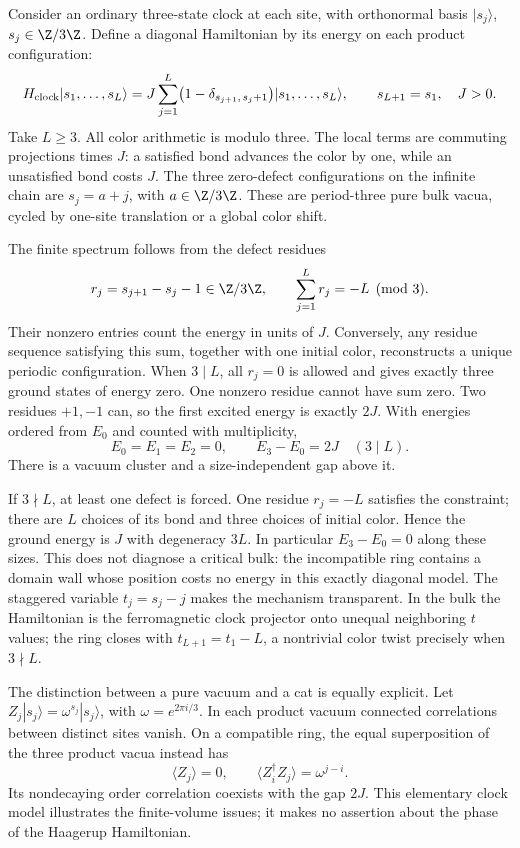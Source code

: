 \begin{example}
\label{ex:gapped-clock-frustration}
Consider an ordinary three-state clock at each site, with orthonormal
basis $|s_j\rangle$, $s_j\in\Z/3\Z$. Define a diagonal Hamiltonian
by its energy on each product configuration:
\[
 H_{\rm clock}|s_1,\ldots,s_L\rangle
 =J\sum_{j=1}^L\bigl(1-\delta_{s_{j+1},\,s_j+1}\bigr)
       |s_1,\ldots,s_L\rangle,
 \qquad s_{L+1}=s_1,\quad J>0.
\]
Take $L\ge3$. All color arithmetic is modulo three. The local
terms are commuting projections times $J$: a satisfied bond
advances the color by one, while an unsatisfied bond costs $J$.
The three zero-defect configurations on the infinite chain are
$s_j=a+j$, with $a\in\Z/3\Z$. These are period-three pure bulk
vacua, cycled by one-site translation or a global color shift.

The finite spectrum follows from the defect residues
\[
 r_j=s_{j+1}-s_j-1\in\Z/3\Z,
 \qquad \sum_{j=1}^L r_j=-L\pmod3.
\]
Their nonzero entries count the energy in units of $J$.
Conversely, any residue sequence satisfying this sum, together
with one initial color, reconstructs a unique periodic configuration.
When $3\mid L$, all $r_j=0$ is allowed and gives exactly three
ground states of energy zero. One nonzero residue cannot have
sum zero. Two residues $+1,-1$ can, so the first excited energy
is exactly $2J$. With energies ordered from $E_0$ and counted
with multiplicity,
\[
 E_0=E_1=E_2=0,\qquad E_3-E_0=2J
 \quad(3\mid L).
\]
There is a vacuum cluster and a size-independent gap above it.

If $3\nmid L$, at least one defect is forced. One residue
$r_j=-L$ satisfies the constraint; there are $L$ choices of
its bond and three choices of initial color. Hence the ground
energy is $J$ with degeneracy $3L$. In particular $E_3-E_0=0$
along these sizes. This does not diagnose a critical bulk:
the incompatible ring contains a domain wall whose position
costs no energy in this exactly diagonal model.
The staggered variable $t_j=s_j-j$ makes the mechanism transparent.
In the bulk the Hamiltonian is the ferromagnetic clock projector
onto unequal neighboring $t$ values; the ring closes with
$t_{L+1}=t_1-L$, a nontrivial color twist precisely when
$3\nmid L$.

The distinction between a pure vacuum and a cat is equally explicit.
Let $Z_j|s_j\rangle=\omega^{s_j}|s_j\rangle$, with
$\omega=e^{2\pi i/3}$. In each product vacuum connected
correlations between distinct sites vanish. On a compatible ring,
the equal superposition of the three product vacua instead has
\[
 \langle Z_j\rangle=0,\qquad
 \langle Z_i^\dagger Z_j\rangle=\omega^{j-i}.
\]
Its nondecaying order correlation coexists with the gap $2J$.
This elementary clock model illustrates the finite-volume issues;
it makes no assertion about the phase of the Haagerup Hamiltonian.
\end{example}

